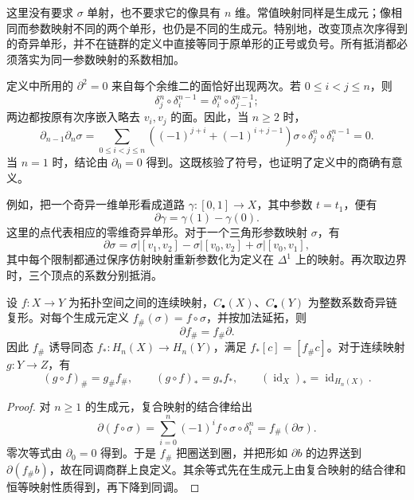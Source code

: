 这里没有要求 \(\sigma\) 单射，也不要求它的像具有 \(n\) 维。常值映射同样是生成元；像相同而参数映射不同的两个单形，也仍是不同的生成元。特别地，改变顶点次序得到的奇异单形，并不在链群的定义中直接等同于原单形的正号或负号。所有抵消都必须落实为同一参数映射的系数相加。

定义中所用的 \(\partial^2=0\) 来自每个余维二的面恰好出现两次。若 \(0\le i<j\le n\)，则
\[
	\delta_j^n\circ\delta_i^{n-1}
	=\delta_i^n\circ\delta_{j-1}^{n-1};
\]
两边都按原有次序嵌入略去 \(v_i,v_j\) 的面。因此，当 \(n\ge2\) 时，
\[
	\partial_{n-1}\partial_n\sigma
	=\sum_{0\le i<j\le n}
	\left((-1)^{j+i}+(-1)^{i+j-1}\right)
	\sigma\circ\delta_j^n\circ\delta_i^{n-1}
	=0.
\]
当 \(n=1\) 时，结论由 \(\partial_0=0\) 得到。这既核验了符号，也证明了定义中的商确有意义。

例如，把一个奇异一维单形看成道路 \(\gamma:[0,1]\to X\)，其中参数 \(t=t_1\)，便有
\[
	\partial\gamma=\gamma(1)-\gamma(0).
\]
这里的点代表相应的零维奇异单形。对于一个三角形参数映射 \(\sigma\)，有
\[
	\partial\sigma
	=\sigma|[v_1,v_2]-\sigma|[v_0,v_2]+\sigma|[v_0,v_1],
\]
其中每个限制都通过保序仿射映射重新参数化为定义在 \(\Delta^1\) 上的映射。再次取边界时，三个顶点的系数分别抵消。

\begin{proposition}\label{g2:prop:singular-functoriality}
	设 \(f:X\to Y\) 为拓扑空间之间的连续映射，\(C_\bullet(X)\)、\(C_\bullet(Y)\) 为整数系数奇异链复形。对每个生成元定义 \(f_\#(\sigma)=f\circ\sigma\)，并按加法延拓，则
	\[
		\partial f_\#=f_\#\partial.
	\]
	因此 \(f_\#\) 诱导同态 \(f_*:H_n(X)\to H_n(Y)\)，满足 \(f_*[c]=[f_\#c]\)。对于连续映射 \(g:Y\to Z\)，有
	\[
		(g\circ f)_\#=g_\#f_\#,\qquad
		(g\circ f)_*=g_*f_*,\qquad
		(\operatorname{id}_X)_*=\operatorname{id}_{H_n(X)}.
	\]
\end{proposition}
\begin{proof}
	对 \(n\ge1\) 的生成元，复合映射的结合律给出
	\[
		\partial(f\circ\sigma)
		=\sum_{i=0}^n(-1)^if\circ\sigma\circ\delta_i^n
		=f_\#(\partial\sigma).
	\]
	零次等式由 \(\partial_0=0\) 得到。于是 \(f_\#\) 把圈送到圈，并把形如 \(\partial b\) 的边界送到 \(\partial(f_\#b)\)，故在同调商群上良定义。其余等式先在生成元上由复合映射的结合律和恒等映射性质得到，再下降到同调。
\end{proof}

